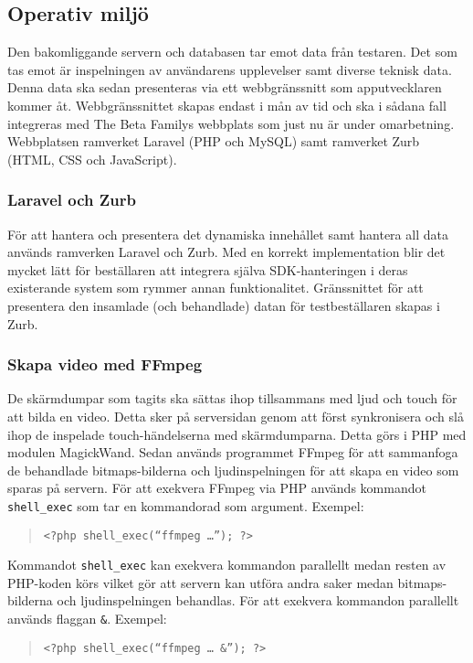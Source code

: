 \subsection{Operativ miljö}
Den bakomliggande servern och databasen tar emot data från testaren. Det som tas emot är inspelningen av användarens upplevelser samt diverse teknisk data. Denna data ska sedan presenteras via ett webbgränssnitt som apputvecklaren kommer åt. Webbgränssnittet skapas endast i mån av tid och ska i sådana fall integreras med The Beta Familys webbplats som just nu är under omarbetning. Webbplatsen ramverket Laravel (PHP och MySQL) samt ramverket Zurb (HTML, CSS och JavaScript).

\subsubsection{Laravel och Zurb}
För att hantera och presentera det dynamiska innehållet samt hantera all data används ramverken Laravel och Zurb. Med en korrekt implementation blir det mycket lätt för beställaren att integrera själva SDK-hanteringen i deras existerande system som rymmer annan funktionalitet. Gränssnittet för att presentera den insamlade (och behandlade) datan för testbeställaren skapas i Zurb.

\subsubsection{Skapa video med FFmpeg}
De skärmdumpar som tagits ska sättas ihop tillsammans med ljud och touch för att bilda en video. Detta sker på serversidan genom att först synkronisera och slå ihop de inspelade touch-händelserna med skärmdumparna. Detta görs i PHP med modulen MagickWand\parencite{magickwand}. Sedan används programmet FFmpeg\parencite{ffmpeg} för att sammanfoga de behandlade bitmaps-bilderna och ljudinspelningen för att skapa en video som sparas på servern. För att exekvera FFmpeg via PHP används kommandot \texttt{shell\_exec}\parencite{shellexec} som tar en kommandorad som argument. Exempel:
\begin{quote}
\texttt{<?php shell\_exec(``ffmpeg \dots''); ?>}
\end{quote}
Kommandot \texttt{shell\_exec} kan exekvera kommandon parallellt medan resten av PHP-koden körs vilket gör att servern kan utföra andra saker medan bitmaps-bilderna och ljudinspelningen behandlas. För att exekvera kommandon parallellt används flaggan \texttt{\&}. Exempel:
\begin{quote}
\texttt{<?php shell\_exec(``ffmpeg \dots~\textbf{\&}''); ?>}
\end{quote}